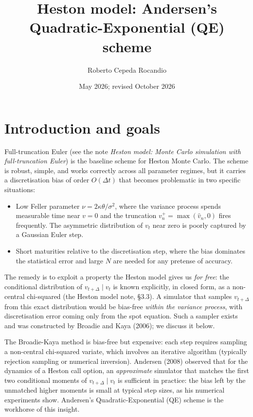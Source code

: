 \documentclass[11pt]{article}
\title{Heston model: Andersen's Quadratic-Exponential (QE) scheme}
\author{Roberto Cepeda Rocandio}
\date{May 2026; revised October 2026}
\theoremstyle{plain}
\theoremstyle{definition}
\theoremstyle{remark}
\begin{document}
\maketitle
\tableofcontents
\bigskip

\section{Introduction and goals}

Full-truncation Euler (see the note \emph{Heston model: Monte Carlo simulation with full-truncation Euler}) is the baseline scheme for Heston Monte Carlo. The scheme is robust, simple, and works correctly across all parameter regimes, but it carries a discretisation bias of order $O(\Delta t)$ that becomes problematic in two specific situations:

\begin{itemize}[topsep=2pt]
    \item Low Feller parameter $\nu = 2\kappa\theta/\sigma^2$, where the variance process spends measurable time near $v = 0$ and the truncation $v_n^+ = \max(\hat v_n, 0)$ fires frequently. The asymmetric distribution of $v_t$ near zero is poorly captured by a Gaussian Euler step.
    \item Short maturities relative to the discretisation step, where the bias dominates the statistical error and large $N$ are needed for any pretense of accuracy.
\end{itemize}

The remedy is to exploit a property the Heston model gives us \emph{for free}: the conditional distribution of $v_{t+\Delta} \mid v_t$ is known explicitly, in closed form, as a non-central chi-squared (the Heston model note, \S3.3). A simulator that samples $v_{t+\Delta}$ from this exact distribution would be bias-free \emph{within the variance process}, with discretisation error coming only from the spot equation. Such a sampler exists and was constructed by Broadie and Kaya (2006); we discuss it below.

The Broadie-Kaya method is bias-free but expensive: each step requires sampling a non-central chi-squared variate, which involves an iterative algorithm (typically rejection sampling or numerical inversion). Andersen (2008) observed that for the dynamics of a Heston call option, an \emph{approximate} simulator that matches the first two conditional moments of $v_{t+\Delta} \mid v_t$ is sufficient in practice: the bias left by the unmatched higher moments is small at typical step sizes, as his numerical experiments show. Andersen's Quadratic-Exponential (QE) scheme is the workhorse of this insight.
\end{document}
